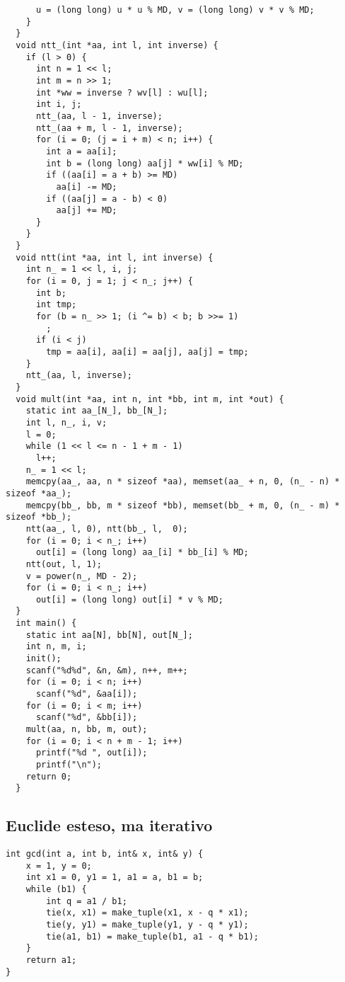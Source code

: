 \begin{lstlisting}
      u = (long long) u * u % MD, v = (long long) v * v % MD;
    }
  }
  void ntt_(int *aa, int l, int inverse) {
    if (l > 0) {
      int n = 1 << l;
      int m = n >> 1;
      int *ww = inverse ? wv[l] : wu[l];
      int i, j;
      ntt_(aa, l - 1, inverse);
      ntt_(aa + m, l - 1, inverse);
      for (i = 0; (j = i + m) < n; i++) {
        int a = aa[i];
        int b = (long long) aa[j] * ww[i] % MD;
        if ((aa[i] = a + b) >= MD)
          aa[i] -= MD;
        if ((aa[j] = a - b) < 0)
          aa[j] += MD;
      }
    }
  }
  void ntt(int *aa, int l, int inverse) {
    int n_ = 1 << l, i, j;
    for (i = 0, j = 1; j < n_; j++) {
      int b;
      int tmp;
      for (b = n_ >> 1; (i ^= b) < b; b >>= 1)
        ;
      if (i < j)
        tmp = aa[i], aa[i] = aa[j], aa[j] = tmp;
    }
    ntt_(aa, l, inverse);
  }
  void mult(int *aa, int n, int *bb, int m, int *out) {
    static int aa_[N_], bb_[N_];
    int l, n_, i, v;
    l = 0;
    while (1 << l <= n - 1 + m - 1)
      l++;
    n_ = 1 << l;
    memcpy(aa_, aa, n * sizeof *aa), memset(aa_ + n, 0, (n_ - n) * sizeof *aa_);
    memcpy(bb_, bb, m * sizeof *bb), memset(bb_ + m, 0, (n_ - m) * sizeof *bb_);
    ntt(aa_, l, 0), ntt(bb_, l,  0);
    for (i = 0; i < n_; i++)
      out[i] = (long long) aa_[i] * bb_[i] % MD;
    ntt(out, l, 1);
    v = power(n_, MD - 2);
    for (i = 0; i < n_; i++)
      out[i] = (long long) out[i] * v % MD;
  }
  int main() {
    static int aa[N], bb[N], out[N_];
    int n, m, i;
    init();
    scanf("%d%d", &n, &m), n++, m++;
    for (i = 0; i < n; i++)
      scanf("%d", &aa[i]);
    for (i = 0; i < m; i++)
      scanf("%d", &bb[i]);
    mult(aa, n, bb, m, out);
    for (i = 0; i < n + m - 1; i++)
      printf("%d ", out[i]);
      printf("\n");
    return 0;
  }
\end{lstlisting}

\subsection{Euclide esteso, ma iterativo}
\begin{lstlisting}
int gcd(int a, int b, int& x, int& y) {
    x = 1, y = 0;
    int x1 = 0, y1 = 1, a1 = a, b1 = b;
    while (b1) {
        int q = a1 / b1;
        tie(x, x1) = make_tuple(x1, x - q * x1);
        tie(y, y1) = make_tuple(y1, y - q * y1);
        tie(a1, b1) = make_tuple(b1, a1 - q * b1);
    }
    return a1;
}
\end{lstlisting}

